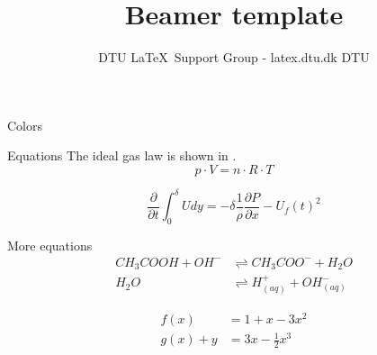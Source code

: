 \documentclass[aspectratio=169,hyperref={pdfpagelabels=false}]{beamer}
\subtitle{DTU \LaTeX~Support Group - latex.dtu.dk DTU}
\title{Beamer template}
\begin{document}
\inserttitlepage


\begin{frame}{Colors}
\begin{testcolors}
\end{testcolors}
\end{frame}

%

\begin{frame}{Equations}
The ideal gas law is shown in .
\begin{equation}
    p \cdot V = n \cdot R \cdot T
\end{equation}

\begin{equation} \label{eq:IME}
    \frac{\partial}{\partial t} \int_{0}^{\delta} U dy = - \delta \frac{1}{\rho}\frac{\partial P}{\partial x}-U_f(t)^2
\end{equation}

\end{frame}

\begin{frame}{More equations}
\begin{equation}
\begin{aligned} 
    CH_3COOH + OH^{-} &\rightleftharpoons CH_3COO^{-} + H_2O \\
    H_2O &\rightleftharpoons H^{+}_{(aq)} + OH^{-}_{(aq)}
\end{aligned}
\end{equation}


\begin{align} 
    \label{eq:align1}     
    f(x) &= 1 + x - 3 x^2 \\
    \label{eq:align2} 
    g(x) + y &= 3x - \frac{1}{2} x^3 
\end{align}
\end{frame}
\end{document}
